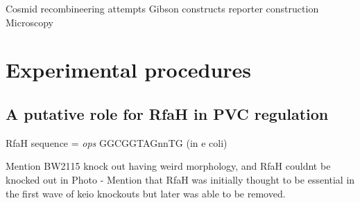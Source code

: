 Cosmid recombineering attempts
Gibson constructs
reporter construction
Microscopy

\section{Experimental procedures}


\subsection{A putative role for RfaH in PVC regulation}

RfaH sequence = \emph{ops} GGCGGTAGnnTG (in e coli) \citep{Sevostyanova2008, Artsimovitch2002}


Mention BW2115 knock out having weird morphology, and RfaH couldnt be knocked out in Photo
 - Mention that RfaH was initially thought to be essential in the first wave of keio knockouts but later was able to be removed.


